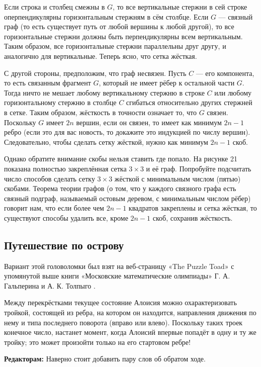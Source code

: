 Если строка и столбец смежны в $G$, то все вертикальные стержни в сей строке оперпендикулярны горизонтальным стержням в сём столбце.
Если $G$ --- связный граф (то есть существует путь от любой вершины к любой другой), то все горизонтальные стержни должны быть перпендикулярны всем вертикальным.
Таким образом, все горизонтальные стержни параллельны друг другу, и аналогично для вертикальные.
Теперь ясно, что сетка жёсткая.

С другой стороны, предположим, что граф несвязен.
Пусть $C$ --- его компонента, то есть связанным фрагмент $G$, который не имеет рёбер к остальной части $G$.
Тогда ничто не мешает любому вертикальному стержню в строке $C$ или любому горизонтальному стержню в столбце $C$ сгибаться относительно других стержней в сетке.
Таким образом, жёсткость в точности означает то, что $G$ связен.
Поскольку $G$ имеет $2n$ вершин, если он связен, то имеет как минимум $2n - 1$ ребро
(если это для вас новость, то докажите это индукцией по числу вершин).
Следовательно, чтобы сделать сетку жёсткой, нужно как минимум $2n - 1$ скоб.

Однако обратите внимание скобы нельзя ставить где попало.
На рисунке 21 показана полностью закреплённая сетка $3 \times 3$ и её граф.
Попробуйте подсчитать число способов сделать сетку $3 \times 3$ жёсткой с минимальным числом (пятью) скобами.
Теорема теории графов (о том, что у каждого связного графа есть связный подграф, называемый остовым деревом, с минимальным числом рёбер) говорит нам, что если более чем $2n - 1$ квадратов закреплены и сетка жёсткая, то существуют способы удалить все, кроме $2n - 1$ скоб, сохранив жёсткость.

\subsection*{Путешествие по острову}

Вариант этой головоломки был взят на веб-страницу «The Puzzle Toad» с упомянутой выше книги «Московские математические олимпиады» Г. А. Гальперина и А. К. Толпыго \cite{galperin-tolpygo}.

Между перекрёстками текущее состояние Алоисия можно охарактеризовать тройкой, состоящей из ребра, на котором он находится, направления движения по нему и типа последнего поворота (вправо или влево).
Поскольку таких троек конечное число, настанет момент, когда Алоисий впервые попадёт в одну и ту же тройку; это может произойти только на его стартовом ребре!

\begin{addedbytheeditors}
\textbf{Редакторам:} Наверно стоит добавить пару слов об обратом ходе.
\end{addedbytheeditors}


